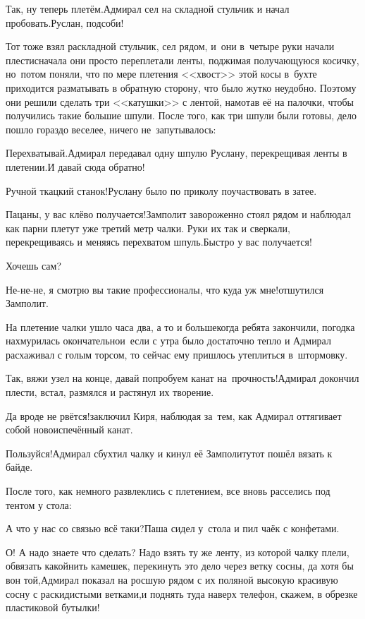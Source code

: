 \diagdash Так, ну теперь плетём.\mdash Адмирал сел на складной стульчик и начал пробовать.\mdash Руслан, подсоби!

Тот тоже взял раскладной стульчик, сел рядом, и~они в~четыре руки начали плести\mdash сначала они просто переплетали ленты, поджимая получающуюся косичку, но~потом поняли, что по мере плетения <<хвост>> этой косы в~бухте приходится разматывать в обратную сторону, что было жутко неудобно. Поэтому они решили сделать три <<катушки>> с лентой, намотав её на палочки, чтобы получились такие большие шпули. После того, как три шпули были готовы, дело пошло гораздо веселее, ничего не~запутывалось:

\diagdash Перехватывай.\mdash Адмирал передавал одну шпулю Руслану, перекрещивая ленты в плетении.\mdash И давай сюда обратно!

\diagdash Ручной ткацкий станок!\mdash Руслану было по приколу поучаствовать в затее.

\diagdash Пацаны, у вас клёво получается!\mdash Замполит завороженно стоял рядом и наблюдал как парни плетут уже третий метр чалки. Руки их так и сверкали, перекрещиваясь и меняясь перехватом шпуль.\mdash Быстро у вас получается!

\diagdash Хочешь сам?

\diagdash Не-не-не, я смотрю вы такие профессионалы, что куда уж мне!\mdash отшутился Замполит.

На плетение чалки ушло часа два, а то и больше\mdash когда ребята закончили, погодка нахмурилась окончательно\mdash и~если с утра было достаточно тепло и Адмирал расхаживал с голым торсом, то сейчас ему пришлось утеплиться в~штормовку.

\diagdash Так, вяжи узел на конце, давай попробуем канат на~прочность!\mdash Адмирал докончил плести, встал, размялся и растянул их творение.

\diagdash Да вроде не рвётся!\mdash заключил Киря, наблюдая за~тем, как Адмирал оттягивает собой новоиспечённый канат.

\diagdash Пользуйся!\mdash Адмирал сбухтил чалку и кинул её Замполиту\mdash тот пошёл вязать к байде.

После того, как немного развлеклись с плетением, все вновь расселись под тентом у стола:

\diagdash А что у нас со связью всё таки?\mdash Паша сидел у~стола и пил чаёк с конфетами.

\diagdash О! А надо знаете что сделать? Надо взять ту же ленту, из которой чалку плели, обвязать какой\sdash нить камешек, перекинуть это дело через ветку сосны, да хотя бы вон той,\mdash Адмирал показал на росшую рядом с их поляной высокую красивую сосну с раскидистыми ветками,\mdash и поднять туда наверх телефон, скажем, в обрезке пластиковой бутылки!

